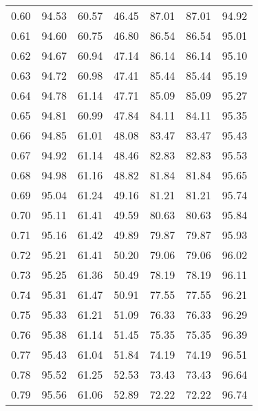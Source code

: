 \begin{tabular}{|c|c|c|c|c|c|c|}
      0.60 &     94.53 &     60.57 &      46.45 &   87.01 &      87.01 &         94.92 \\
      0.61 &     94.60 &     60.75 &      46.80 &   86.54 &      86.54 &         95.01 \\
      0.62 &     94.67 &     60.94 &      47.14 &   86.14 &      86.14 &         95.10 \\
      0.63 &     94.72 &     60.98 &      47.41 &   85.44 &      85.44 &         95.19 \\
      0.64 &     94.78 &     61.14 &      47.71 &   85.09 &      85.09 &         95.27 \\
      0.65 &     94.81 &     60.99 &      47.84 &   84.11 &      84.11 &         95.35 \\
      0.66 &     94.85 &     61.01 &      48.08 &   83.47 &      83.47 &         95.43 \\
      0.67 &     94.92 &     61.14 &      48.46 &   82.83 &      82.83 &         95.53 \\
      0.68 &     94.98 &     61.16 &      48.82 &   81.84 &      81.84 &         95.65 \\
      0.69 &     95.04 &     61.24 &      49.16 &   81.21 &      81.21 &         95.74 \\
      0.70 &     95.11 &     61.41 &      49.59 &   80.63 &      80.63 &         95.84 \\
      0.71 &     95.16 &     61.42 &      49.89 &   79.87 &      79.87 &         95.93 \\
      0.72 &     95.21 &     61.41 &      50.20 &   79.06 &      79.06 &         96.02 \\
      0.73 &     95.25 &     61.36 &      50.49 &   78.19 &      78.19 &         96.11 \\
      0.74 &     95.31 &     61.47 &      50.91 &   77.55 &      77.55 &         96.21 \\
      0.75 &     95.33 &     61.21 &      51.09 &   76.33 &      76.33 &         96.29 \\
      0.76 &     95.38 &     61.14 &      51.45 &   75.35 &      75.35 &         96.39 \\
      0.77 &     95.43 &     61.04 &      51.84 &   74.19 &      74.19 &         96.51 \\
      0.78 &     95.52 &     61.25 &      52.53 &   73.43 &      73.43 &         96.64 \\
      0.79 &     95.56 &     61.06 &      52.89 &   72.22 &      72.22 &         96.74 \\

\end{tabular}
